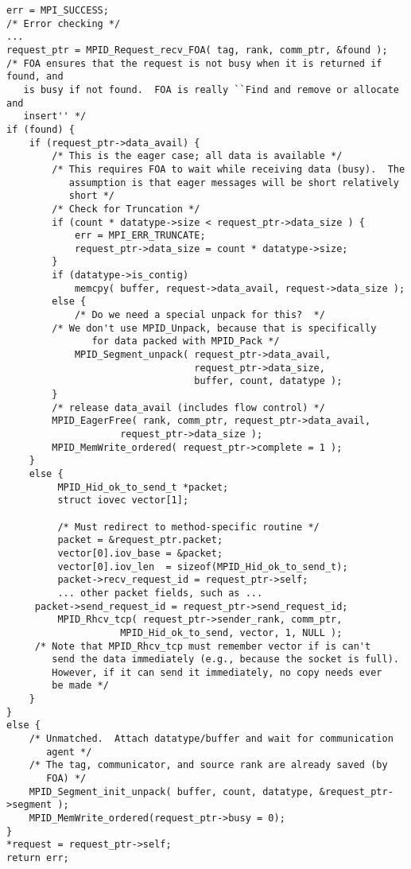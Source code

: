 \begin{verbatim}
err = MPI_SUCCESS;
/* Error checking */
...
request_ptr = MPID_Request_recv_FOA( tag, rank, comm_ptr, &found );
/* FOA ensures that the request is not busy when it is returned if found, and
   is busy if not found.  FOA is really ``Find and remove or allocate and 
   insert'' */
if (found) {
    if (request_ptr->data_avail) {
        /* This is the eager case; all data is available */
        /* This requires FOA to wait while receiving data (busy).  The
           assumption is that eager messages will be short relatively
           short */
        /* Check for Truncation */
        if (count * datatype->size < request_ptr->data_size ) {
            err = MPI_ERR_TRUNCATE;
            request_ptr->data_size = count * datatype->size;
        }
        if (datatype->is_contig) 
            memcpy( buffer, request->data_avail, request->data_size );
        else {
            /* Do we need a special unpack for this?  */
	    /* We don't use MPID_Unpack, because that is specifically
               for data packed with MPID_Pack */
            MPID_Segment_unpack( request_ptr->data_avail, 
                                 request_ptr->data_size, 
                                 buffer, count, datatype );
        }
        /* release data_avail (includes flow control) */
        MPID_EagerFree( rank, comm_ptr, request_ptr->data_avail,
	                request_ptr->data_size );
        MPID_MemWrite_ordered( request_ptr->complete = 1 );
    }
    else {
         MPID_Hid_ok_to_send_t *packet;
         struct iovec vector[1];

         /* Must redirect to method-specific routine */
         packet = &request_ptr.packet;
         vector[0].iov_base = &packet;
         vector[0].iov_len  = sizeof(MPID_Hid_ok_to_send_t);
         packet->recv_request_id = request_ptr->self;
         ... other packet fields, such as ...
	 packet->send_request_id = request_ptr->send_request_id;
         MPID_Rhcv_tcp( request_ptr->sender_rank, comm_ptr,
	                MPID_Hid_ok_to_send, vector, 1, NULL );
	 /* Note that MPID_Rhcv_tcp must remember vector if is can't
	    send the data immediately (e.g., because the socket is full).
	    However, if it can send it immediately, no copy needs ever
	    be made */
    }
}
else {
    /* Unmatched.  Attach datatype/buffer and wait for communication
       agent */
    /* The tag, communicator, and source rank are already saved (by
       FOA) */ 
    MPID_Segment_init_unpack( buffer, count, datatype, &request_ptr->segment );
    MPID_MemWrite_ordered(request_ptr->busy = 0);
}
*request = request_ptr->self;
return err;
\end{verbatim}


